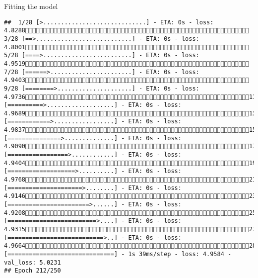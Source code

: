 \documentclass[
  ignorenonframetext,
]{beamer}
\begin{document}
\begin{frame}[fragile]{Fitting the model}
\begin{verbatim}
##  1/28 [>.............................] - ETA: 0s - loss: 4.8288 3/28 [==>...........................] - ETA: 0s - loss: 4.8001 5/28 [====>.........................] - ETA: 0s - loss: 4.9519 7/28 [======>.......................] - ETA: 0s - loss: 4.9403 9/28 [========>.....................] - ETA: 0s - loss: 4.973611/28 [==========>...................] - ETA: 0s - loss: 4.968913/28 [============>.................] - ETA: 0s - loss: 4.983715/28 [===============>..............] - ETA: 0s - loss: 4.909017/28 [=================>............] - ETA: 0s - loss: 4.940419/28 [===================>..........] - ETA: 0s - loss: 4.976821/28 [=====================>........] - ETA: 0s - loss: 4.914623/28 [=======================>......] - ETA: 0s - loss: 4.920825/28 [=========================>....] - ETA: 0s - loss: 4.931527/28 [===========================>..] - ETA: 0s - loss: 4.966428/28 [==============================] - 1s 39ms/step - loss: 4.9584 - val_loss: 5.0231
## Epoch 212/250

\end{verbatim}
\end{frame}
\end{document}
